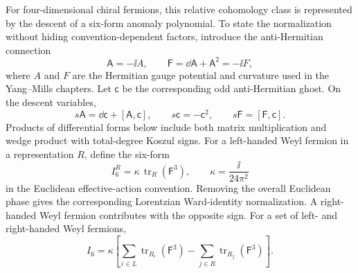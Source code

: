 For four-dimensional chiral fermions, this relative cohomology class is
represented by the descent of a six-form anomaly polynomial.  To state the
normalization without hiding convention-dependent factors, introduce the
anti-Hermitian connection
\[
  \mathsf A=-\ii A,
  \qquad
  \mathsf F=\dd\mathsf A+\mathsf A^2=-\ii F ,
\]
where \(A\) and \(F\) are the Hermitian gauge potential and curvature used in
the Yang--Mills chapters.  Let \(\mathsf c\) be the corresponding odd
anti-Hermitian ghost.  On the descent variables,
\begin{equation}
  s\mathsf A=\dd\mathsf c+[\mathsf A,\mathsf c],
  \qquad
  s\mathsf c=-\mathsf c^2,
  \qquad
  s\mathsf F=[\mathsf F,\mathsf c].
  \label{eq:descent-brst-connection}
\end{equation}
Products of differential forms below include both matrix multiplication and
wedge product with total-degree Koszul signs.  For a left-handed Weyl fermion
in a representation \(R\), define the six-form
\[
  I_6^R
  =
  \kappa\,\operatorname{tr}_R(\mathsf F^3),
  \qquad
  \kappa=\frac{\ii}{24\pi^2}
\]
in the Euclidean effective-action convention.  Removing the overall Euclidean
phase gives the corresponding Lorentzian Ward-identity normalization.  A
right-handed Weyl fermion contributes with the opposite sign.  For a set of
left- and right-handed Weyl fermions,
\[
  I_6
  =
  \kappa
  \left[
    \sum_{i\in L}\operatorname{tr}_{R_i}(\mathsf F^3)
    -
    \sum_{j\in R}\operatorname{tr}_{R_j}(\mathsf F^3)
  \right].
\]

